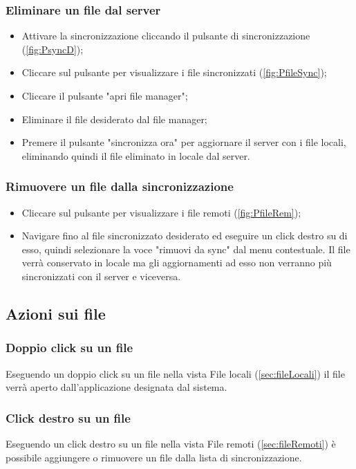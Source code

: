 \subsubsection{Eliminare un file dal server}
\begin{itemize}
\item Attivare la sincronizzazione cliccando il pulsante di sincronizzazione (\ref{fig:PsyncD});
\item Cliccare sul pulsante per visualizzare i file sincronizzati (\ref{fig:PfileSync});
\item Cliccare il pulsante "apri file manager";
\item Eliminare il file desiderato dal file manager;
\item Premere il pulsante "sincronizza ora" per aggiornare il server con i file locali, eliminando quindi il file eliminato in locale dal server.
\end{itemize}
\subsubsection{Rimuovere un file dalla sincronizzazione}
\begin{itemize}
\item Cliccare sul pulsante per visualizzare i file remoti (\ref{fig:PfileRem});
\item Navigare fino al file sincronizzato desiderato ed eseguire un click destro su di esso, quindi selezionare la voce "rimuovi da sync" dal menu contestuale. Il file verrà conservato in locale ma gli aggiornamenti ad esso non verranno più sincronizzati con il server e viceversa.
\end{itemize}

\subsection{Azioni sui file}
\label{sec:fileActions}

\subsubsection{Doppio click su un file}
Eseguendo un doppio click su un file nella vista File locali (\ref{sec:fileLocali}) il file verrà aperto dall'applicazione designata dal sistema.
\subsubsection{Click destro su un file}
Eseguendo un click destro su un file nella vista File remoti (\ref{sec:fileRemoti}) è possibile aggiungere o rimuovere un file dalla lista di sincronizzazione.  

